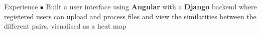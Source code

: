 \begin{rubric}{Experience}
        $\bullet$ Built a user interface using \textbf{Angular} with a \textbf{Django} backend where registered users can upload and process files and view the similarities between the different pairs, visualised as a heat map

        



        
        
\end{rubric}